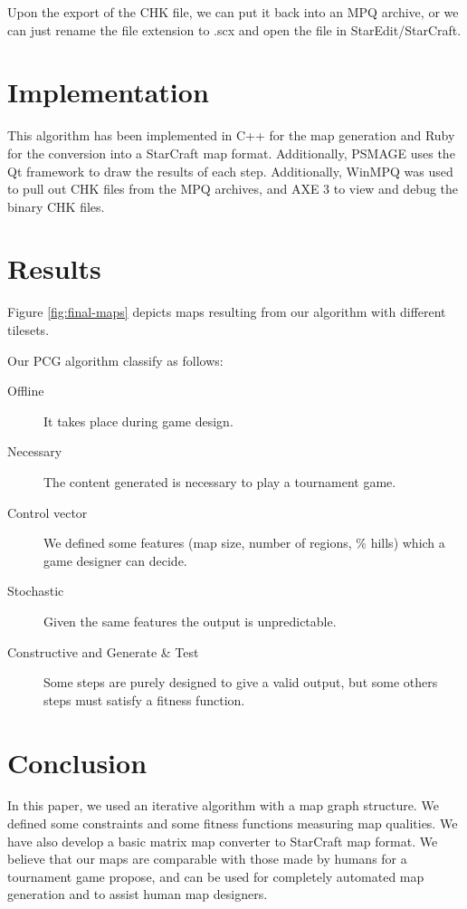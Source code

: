 \documentclass[letterpaper]{article}
\begin{document}
Upon the export of the CHK file, we can put it back into an MPQ archive, or we can just rename the file extension to .scx and open the file in StarEdit/StarCraft.



\section{Implementation} %
\label{sec:implementation}
This algorithm has been implemented in C++ for the map generation and Ruby for the conversion into a StarCraft map format. Additionally, PSMAGE uses the Qt framework to draw the results of each step. Additionally, WinMPQ was used to pull out CHK files from the MPQ archives, and AXE 3 to view and debug the binary CHK files.


\section{Results} %
\label{sec:results}
Figure \ref{fig:final-maps} depicts maps resulting from our algorithm with different tilesets.

Our PCG algorithm classify as follows:
\begin{description}
	\item[Offline] It takes place during game design.
	\item[Necessary] The content generated is necessary to play a tournament game.
	\item[Control vector] We defined some features (map size, number of regions, \% hills) which a game designer can decide.
	\item[Stochastic] Given the same features the output is unpredictable.
	\item[Constructive and Generate \& Test] Some steps are purely designed to give a valid output, but some others steps must satisfy a fitness function.
\end{description}



\section{Conclusion} %
\label{sec:conclusion}
In this paper, we used an iterative algorithm with a map graph structure. We defined some constraints and some ﬁtness functions measuring map qualities. We have also develop a basic matrix map converter to StarCraft map format. We believe that our maps are comparable with those made by humans for a tournament game propose, and can be used for completely automated map generation and to assist human map designers.
\end{document}

